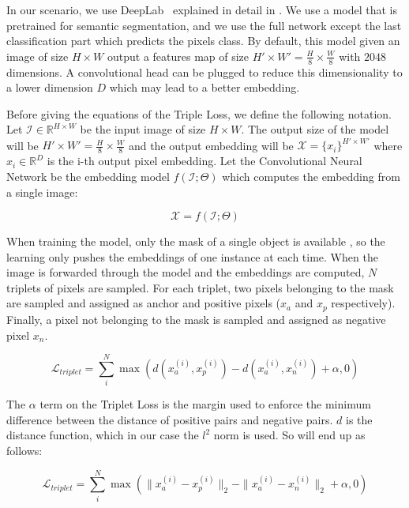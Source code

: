 In our scenario, we use DeepLab~\deeplab{} explained in detail in .
We use a model that is pretrained for semantic segmentation, and we use the full network except the last classification part which predicts the pixels class.
By default, this model given an image of size $H \times W$ output a features map of size $H' \times W' = \frac{H}{8} \times \frac{W}{8}$ with $2048$ dimensions.
A convolutional head can be plugged to reduce this dimensionality to a lower dimension $D$ which may lead to a better embedding.

Before giving the equations of the Triple Loss, we define the following notation.
Let $\mathcal{I} \in \mathbb{R}^{H \times W}$ be the input image of size $H \times W$.
The output size of the model will be $H' \times W' = \frac{H}{8} \times \frac{W}{8}$ and the output embedding will be $\mathcal{X} = \{x_i\}^{H' \times W'}$ where $x_i \in \mathbb{R}^D$ is the i-th output pixel embedding.
Let the Convolutional Neural Network be the embedding model $f(\mathcal{I}; \Theta)$ which computes the embedding from a single image:

\begin{equation}
  \mathcal{X} = f(\mathcal{I}; \Theta)
\end{equation}

When training the model,
only the mask of a single object is available , so the learning only pushes the embeddings of one instance at each time.
When the image is forwarded through the model and the embeddings are computed, $N$ triplets of pixels are sampled.
For each triplet, two pixels belonging to the mask are sampled and assigned as anchor and positive pixels ($x_a$ and $x_p$ respectively).
Finally, a pixel not belonging to the mask is sampled and assigned as negative pixel $x_n$.

\begin{equation}
  \label{eq:tripletloss:1}
  \mathcal{L}_{triplet} = \sum_i^N \max \left( d(x_a^{(i)}, x_p^{(i)}) - d(x_a^{(i)}, x_n^{(i)})  + \alpha, 0 \right)
\end{equation}

The $\alpha$ term on the Triplet Loss is the margin used to enforce the minimum difference between the distance of positive pairs and negative pairs.
$d$ is the distance function, which in our case the $l^2$ norm is used.
So  will end up as follows:

\begin{equation}
  \label{eq:tripletloss:2}
  \mathcal{L}_{triplet} =
	\sum_i^N \max \left(
		\|x_a^{(i)} - x_p^{(i)}\|_2 - \|x_a^{(i)} - x_n^{(i)}\|_2  + \alpha,
		0 \right)
\end{equation}

